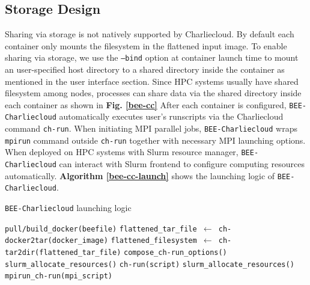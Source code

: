 \subsection{Storage Design}
Sharing via storage is not natively supported by Charliecloud. By default each container only mounts the filesystem in the flattened input image. To enable sharing via storage, we use the \texttt{--bind} option  at container launch time to mount an user-specified host directory to a shared directory inside the container as mentioned in the user interface section. Since HPC systems usually have shared filesystem among nodes, processes can share data via the shared directory inside each container as shown in \textbf{Fig. \ref{bee-cc}} After each container is configured, \texttt{BEE-Charliecloud} automatically executes user's runscripts via the Charliecloud command \texttt{ch-run}. When initiating MPI parallel jobs, \texttt{BEE-Charliecloud} wraps \texttt{mpirun} command outside \texttt{ch-run} together with necessary MPI launching options. When deployed on HPC systems with Slurm resource manager, \texttt{BEE-Charliecloud} can interact with Slurm frontend to configure computing resources automatically. \textbf{Algorithm \ref{bee-cc-launch}} shows the launching logic of \texttt{BEE-Charliecloud}.

\begin{algorithm}
\caption{\texttt{BEE-Charliecloud} launching logic}
\label{bee-cc-launch}
\begin{algorithmic}[1]
\STATE \texttt{pull/build\_docker(beefile)}
\STATE \texttt{flattened\_tar\_file $\leftarrow$ ch-docker2tar(docker\_image)}
\STATE \texttt{flattened\_filesystem $\leftarrow$ ch-tar2dir(flattened\_tar\_file)}
\STATE \texttt{compose\_ch-run\_options()}
\STATE \texttt{slurm\_allocate\_resources()}
\STATE \texttt{ch-run(script)}
\ENDFOR
{}
\STATE \texttt{slurm\_allocate\_resources()}
\STATE \texttt{mpirun\_ch-run(mpi\_script)}
\ENDFOR

\end{algorithmic}
\end{algorithm}